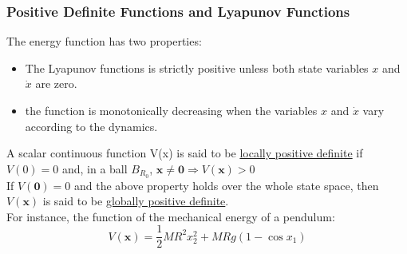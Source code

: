 \documentclass[11pt,handout]{beamer}   %
\begin{document}
\begin{frame}
\frametitle{Positive Definite Functions and Lyapunov Functions}
The energy function has two properties:
\begin{itemize}
\item The Lyapunov functions is strictly positive unless both state variables $x$ and $\dot{x}$ are zero.
\item the function is monotonically decreasing when the variables $x$ and $\dot{x}$ vary according to the dynamics.
\end{itemize}
A scalar continuous function V(x) is said to be \underline{locally positive definite} if $V(0) = 0$ and, in a ball $B_{R_0}$, $\mathbf{x} \neq \mathbf{0} \Rightarrow V(\mathbf{x})>0$\\
\vspace{6pt}
If $V(\mathbf{0})=0$ and the above property holds over the whole state space, then $V(\mathbf{x})$ is said to be \underline{globally positive definite}.\\
For instance, the function of the mechanical energy of a pendulum:\\
\begin{equation*}
V(\mathbf{x}) = \frac{1}{2}MR^2 x_2^2 + MRg(1-\cos x_1)
\end{equation*}
\end{frame}
\end{document}
